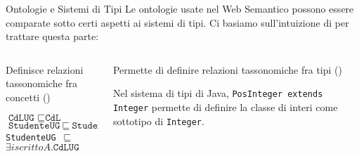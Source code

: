 \begin{frame}[containsverbatim]{Ontologie e Sistemi di Tipi}
	Le ontologie usate nel Web Semantico possono essere comparate sotto certi aspetti ai sistemi di tipi. Ci basiamo sull'intuizione di  per trattare questa parte:
	
	\begin{columns}
		\begin{column}[T]{0.45\textwidth}
			\begin{center}
			\end{center}			
			Definisce relazioni tassonomiche fra concetti ()
			\begin{example}
				$\texttt{$\texttt{CdLUG }\sqsubseteq \texttt{CdL}$}$
				$\texttt{StudenteUG}~\sqsubseteq~\texttt{Studente}$\\
				\texttt{StudenteUG}~$\sqsubseteq$~\texttt{$\exists iscrittoA.\texttt{CdLUG}$}
			\end{example}
			
		\end{column}
		\hspace{0.05\textwidth}
		\begin{column}[T]{0.45\textwidth}
			\begin{center}
			\end{center}
			Permette di definire relazioni tassonomiche fra tipi ()
			\begin{example}
				Nel sistema di tipi di Java, \mbox{\texttt{PosInteger extends Integer}} permette di definire la classe di interi  come sottotipo di \texttt{Integer}.
			\end{example}
		\end{column}
	\end{columns}
	
\end{frame}

